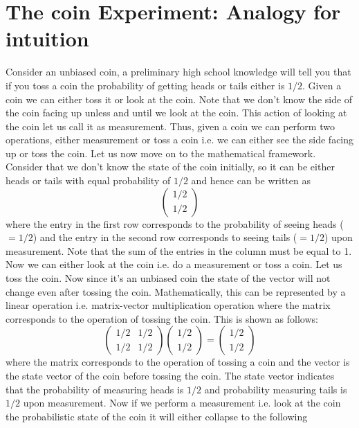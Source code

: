 \documentclass[12pt, oneside]{book}
\theoremstyle{definition}
\theoremstyle{definition}
\theoremstyle{remark}
\begin{document}
\section{The coin Experiment: Analogy for intuition}
Consider an unbiased coin, a preliminary high school knowledge will tell you that if you toss a coin the probability of getting heads or tails either is $1/2$. Given a coin we can either toss it or look at the coin. Note that we don't know the side of the coin facing up unless and until we look at the coin. This action of looking at the coin let us call it as measurement. Thus, given a coin we can perform two operations, either measurement or toss a coin i.e. we can either see the side facing up or toss the coin. Let us now move on to the mathematical framework. Consider that we don't know the state of the coin initially, so it can be either heads or tails with equal probability of $1/2$ and hence can be written as
\[
\begin{pmatrix} 1/2 \\ 1/2 \end{pmatrix}
\]
where the entry in the first row corresponds to the probability of seeing heads ($=1/2$) and the entry in the second row corresponds to seeing tails ($=1/2$) upon measurement. Note that the sum of the entries in the column must be equal to 1. Now we can either look at the coin i.e. do a measurement or toss a coin. Let us toss the coin. Now since it's an unbiased coin the state of the vector will not change even after tossing the coin. Mathematically, this can be represented by a linear operation i.e. matrix-vector multiplication operation where the matrix corresponds to the operation of tossing the coin. This is shown as follows:
\[
\begin{pmatrix} 1/2 & 1/2 \\ 1/2 & 1/2 \end{pmatrix} \begin{pmatrix} 1/2 \\ 1/2 \end{pmatrix} = \begin{pmatrix} 1/2 \\ 1/2 \end{pmatrix}
\]
where the matrix corresponds to the operation of tossing a coin and the vector is the state vector of the coin before tossing the coin. The state vector indicates that the probability of measuring heads is $1/2$ and probability measuring tails is $1/2$ upon measurement. Now if we perform a measurement i.e. look at the coin the probabilistic state of the coin it will either collapse to the following
\end{document}
